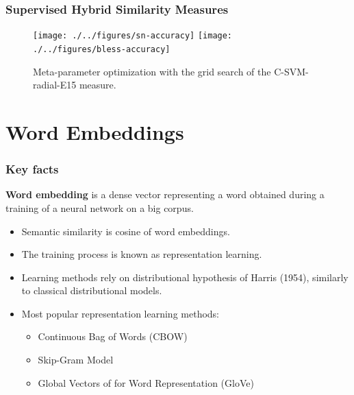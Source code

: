 \begin{frame}
\frametitle{Supervised Hybrid Similarity Measures}
\begin{figure}
\centering
\texttt{[image: ./../figures/sn-accuracy]}
\texttt{[image: ./../figures/bless-accuracy]}
     
\caption{ Meta-parameter optimization with the grid search of the C-SVM-radial-E15 measure.  }
\label{fig:radial-optimization}
\end{figure}
\end{frame}



\section[Word Embeddings]{Word Embeddings}

\begin{frame}
\frametitle{Key facts}

\textbf{Word embedding} is a dense vector representing a word obtained during a training of a neural network on a big corpus. 

\begin{itemize}
\item Semantic similarity is cosine of word embeddings. 

\item The training process is known as representation learning. 

\item Learning methods rely on distributional hypothesis of Harris (1954), similarly to classical distributional models. 

\item Most popular representation learning methods: 

\begin{itemize}
\item Continuous Bag of Words (CBOW) 

\item Skip-Gram Model 

\item Global Vectors of for Word Representation (GloVe)
\end{itemize}
\end{itemize}

\end{frame}



